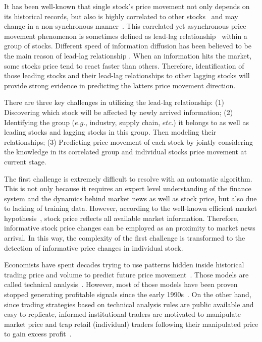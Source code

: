 \documentclass[sigconf]{acmart}
\renewcommand{\cite}{\citep}
\begin{document}
It has been well-known that single stock's price movement not
only depends on its historical records, but also is highly
correlated to other
stocks~\cite{lo1990contrarian,mech1993portfolio} and may change
in a non-synchronous
manner~\cite{lo1990contrarian,brennan1993investment}. This
correlated yet asynchronous price movement phenomenon is
sometimes defined as lead-lag relationship~\cite{hou2007industry}
within a group of stocks. Different speed of information
diffusion has been believed to be the main reason of lead-lag
relationship
\cite{lo1990contrarian,badrinath1995shepherds,mcqueen1996delayed}.
When an information hits the market, some stocks\textquotesingle
price tend to react faster than others. Therefore, identification
of those leading stocks and their lead-lag relationships to other
lagging stocks will provide strong evidence in predicting the
latter\textquotesingle s price movement direction.

There are three key challenges in utilizing the lead-lag
relationship: (1) Discovering which stock will be affected by
newly arrived information; (2) Identifying the group ($e.g.$,
industry, supply chain, $etc.$) it belongs to as well as leading
stocks and lagging stocks in this group. Then modeling their
relationships; (3) Predicting price movement of each stock by
jointly considering the knowledge in its correlated group and
individual stock\textquotesingle s price movement at current
stage.

The first challenge is extremely difficult to resolve with an
automatic algorithm. This is not only because it requires an
expert level understanding of the finance system and the dynamics
behind market news as well as stock price, but also due to
lacking of training data. However, according to the well-known
efficient market hypothesis~\cite{malkiel1970efficient}, stock
price reflects all available market information. Therefore,
informative stock price changes can be employed as an proximity
to market news arrival. In this way, the complexity of the first
challenge is transformed to the detection of informative price
changes in individual stock.

Economists have spent decades trying to use patterns hidden
inside historical trading price and volume to predict future
price movement~\cite{fama1966filter,jensen1967random}. Those
models are called technical
analysis~\cite{kirkpatrick2010technical}. However, most of those
models have been proven stopped generating profitable signals
since the early 1990s~\cite{park2007we}. On the other hand, since
trading strategies based on technical analysis rules are public
available and easy to replicate, informed institutional traders
are motivated to manipulate market price and trap retail
(individual) traders following their manipulated price to gain
excess profit~\cite{sun2016decision}.
\end{document}
